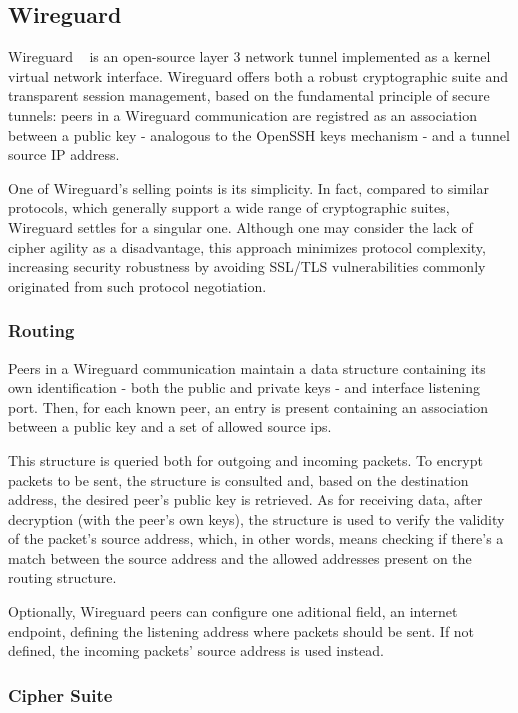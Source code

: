 \documentclass[11pt,twoside,a4paper]{report}
\begin{document}
\subsection{Wireguard}

Wireguard ~\cite{donenfeld2017wireguard} is an open-source layer 3 network tunnel implemented as a kernel virtual network interface. Wireguard offers both a robust cryptographic suite and transparent session management, based on the fundamental principle of secure tunnels: peers in a Wireguard communication are registred as an association between a public key - analogous to the OpenSSH keys mechanism - and a tunnel source IP address.

One of Wireguard's selling points is its simplicity. In fact, compared to similar protocols, which generally support a wide range of cryptographic suites, Wireguard settles for a singular one. Although one may consider the lack of cipher agility as a disadvantage, this approach minimizes protocol complexity, increasing security robustness by avoiding SSL/TLS vulnerabilities commonly originated from such protocol negotiation.

\subsubsection{Routing}

Peers in a Wireguard communication maintain a data structure containing its own identification - both the public and private keys - and interface listening port. Then, for each known peer, an entry is present containing an association between a public key and a set of allowed source ips.

This structure is queried both for outgoing and incoming packets. To encrypt packets to be sent, the structure is consulted and, based on the destination address, the desired peer's public key is retrieved. As for receiving data, after decryption (with the peer's own keys), the structure is used to verify the validity of the packet's source address, which, in other words, means checking if there's a match between the source address and the allowed addresses present on the routing structure.

Optionally, Wireguard peers can configure one aditional field, an internet endpoint, defining the listening address where packets should be sent. If not defined, the incoming packets' source address is used instead.

\subsubsection{Cipher Suite}
\end{document}
